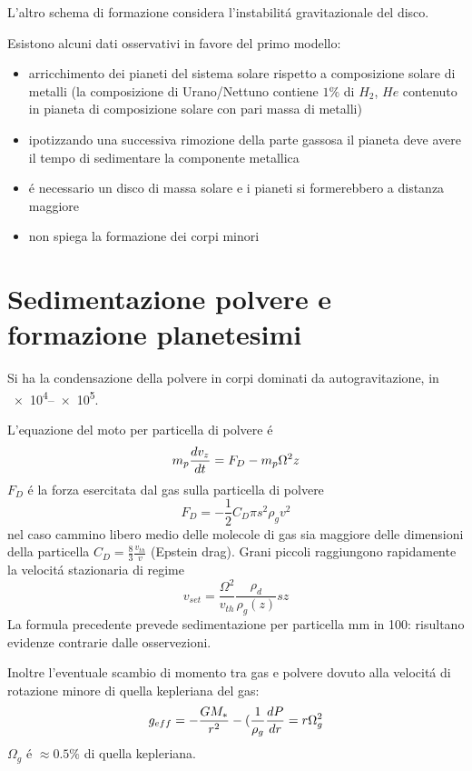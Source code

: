 \begin{workout}
L'altro schema di formazione considera l'instabilit\'a gravitazionale del disco. 

Esistono alcuni dati osservativi in favore del primo modello:
\begin{itemize}
\item arricchimento dei pianeti del sistema solare rispetto a composizione solare di metalli (la composizione di Urano/Nettuno contiene $1\%$ di $H_2$, $He$ contenuto in pianeta di composizione solare con pari massa di metalli)
\item ipotizzando una successiva rimozione della parte gassosa il pianeta deve avere il tempo di sedimentare la componente metallica
\item \'e necessario un disco di massa solare e i pianeti si formerebbero a distanza maggiore
\item non spiega la formazione dei corpi minori
\end{itemize}

\section{Sedimentazione polvere e formazione planetesimi}

Si ha la condensazione della polvere in corpi dominati da autogravitazione, in \SIrange{e4}{e5}{\year}.

L'equazione del moto per particella di polvere \'e
\begin{equation}
m_p\TDy{t}{v_z}=F_D-m_p\Omega^2z
\end{equation}
$F_D$ \'e la forza esercitata dal gas sulla particella di polvere
\begin{equation}
F_D=-\frac{1}{2}C_D\pi s^2\rho_gv^2
\end{equation}
nel caso cammino libero medio delle molecole di gas sia maggiore delle dimensioni della particella $C_D=\frac{8}{3}\frac{v_{th}}{v}$ (Epstein drag).
Grani piccoli raggiungono rapidamente la velocit\'a stazionaria di regime
\begin{equation}
v_{set}=\frac{\Omega^2}{v_{th}}\frac{\rho_d}{\rho_g(z)}sz
\end{equation}
La formula precedente prevede sedimentazione per particella mm in 100: risultano evidenze contrarie dalle osservezioni.

Inoltre l'eventuale scambio di momento tra gas e polvere dovuto alla velocit\'a di rotazione minore di quella kepleriana del gas:
\begin{equation}
g_{eff}=-\frac{GM_*}{r^2}-(\frac{1}{\rho_g}\TDy{r}{P}=r\Omega_g^2
\end{equation}
$\Omega_g$ \'e $\approx0.5\%$ di quella kepleriana.


\end{workout}

